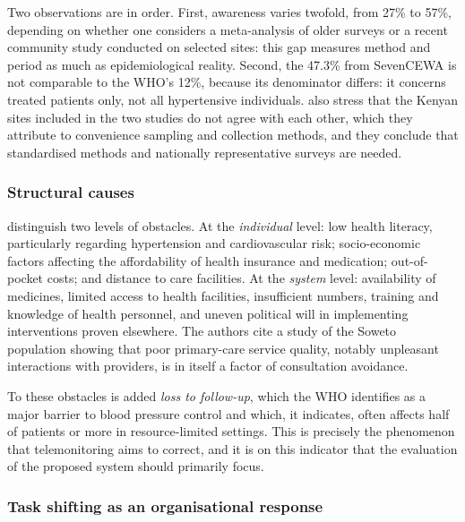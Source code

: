 \documentclass[12pt,a4paper,oneside]{report}
\begin{document}
Two observations are in order. First, awareness varies twofold, from 27\% to 57\%, depending on whether one considers a meta-analysis of older surveys or a recent community study conducted on selected sites: this gap measures method and period as much as epidemiological reality. Second, the 47.3\% from SevenCEWA is not comparable to the WHO's 12\%, because its denominator differs: it concerns treated patients only, not all hypertensive individuals. \textcite{gafane2025} also stress that the Kenyan sites included in the two studies do not agree with each other, which they attribute to convenience sampling and collection methods, and they conclude that standardised methods and nationally representative surveys are needed.

\subsubsection{Structural causes}

\textcite{gafane2025} distinguish two levels of obstacles. At the \emph{individual} level: low health literacy, particularly regarding hypertension and cardiovascular risk; socio-economic factors affecting the affordability of health insurance and medication; out-of-pocket costs; and distance to care facilities. At the \emph{system} level: availability of medicines, limited access to health facilities, insufficient numbers, training and knowledge of health personnel, and uneven political will in implementing interventions proven elsewhere. The authors cite a study of the Soweto population showing that poor primary-care service quality, notably unpleasant interactions with providers, is in itself a factor of consultation avoidance.

To these obstacles is added \emph{loss to follow-up}, which the WHO \parencite{who2023hypertension} identifies as a major barrier to blood pressure control and which, it indicates, often affects half of patients or more in resource-limited settings. This is precisely the phenomenon that telemonitoring aims to correct, and it is on this indicator that the evaluation of the proposed system should primarily focus.

\subsubsection{Task shifting as an organisational response}
\end{document}
